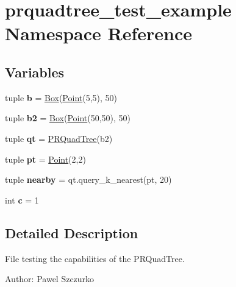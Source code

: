 \hypertarget{namespaceprquadtree__test__example}{}\section{prquadtree\+\_\+test\+\_\+example Namespace Reference}
\label{namespaceprquadtree__test__example}
\subsection*{Variables}
\begin{DoxyCompactItemize}
\item 
\hypertarget{namespaceprquadtree__test__example_a430c6e4c1960cb0326d40a60be817d65}{}tuple {\bfseries b} = \hyperlink{classprquadtree_1_1Box}{Box}(\hyperlink{classprquadtree_1_1Point}{Point}(5,5), 50)\label{namespaceprquadtree__test__example_a430c6e4c1960cb0326d40a60be817d65}

\item 
\hypertarget{namespaceprquadtree__test__example_a6c76891a5f566a70e8ab91c9946be5a2}{}tuple {\bfseries b2} = \hyperlink{classprquadtree_1_1Box}{Box}(\hyperlink{classprquadtree_1_1Point}{Point}(50,50), 50)\label{namespaceprquadtree__test__example_a6c76891a5f566a70e8ab91c9946be5a2}

\item 
\hypertarget{namespaceprquadtree__test__example_a92699a8bb92121b0ffdac66d511f3359}{}tuple {\bfseries qt} = \hyperlink{classprquadtree_1_1PRQuadTree}{P\+R\+Quad\+Tree}(b2)\label{namespaceprquadtree__test__example_a92699a8bb92121b0ffdac66d511f3359}

\item 
\hypertarget{namespaceprquadtree__test__example_ab0091dbc0243fa027e0bc7025d8ea3ad}{}tuple {\bfseries pt} = \hyperlink{classprquadtree_1_1Point}{Point}(2,2)\label{namespaceprquadtree__test__example_ab0091dbc0243fa027e0bc7025d8ea3ad}

\item 
\hypertarget{namespaceprquadtree__test__example_a2024920106d8770dc2cfa9da1e4fe410}{}tuple {\bfseries nearby} = qt.\+query\+\_\+k\+\_\+nearest(pt, 20)\label{namespaceprquadtree__test__example_a2024920106d8770dc2cfa9da1e4fe410}

\item 
\hypertarget{namespaceprquadtree__test__example_a51f7199631c374c21ed3dada86cc3766}{}int {\bfseries c} = 1\label{namespaceprquadtree__test__example_a51f7199631c374c21ed3dada86cc3766}

\end{DoxyCompactItemize}


\subsection{Detailed Description}
\begin{DoxyVerb}File testing the capabilities of the PRQuadTree.

Author: Pawel Szczurko
\end{DoxyVerb}
 